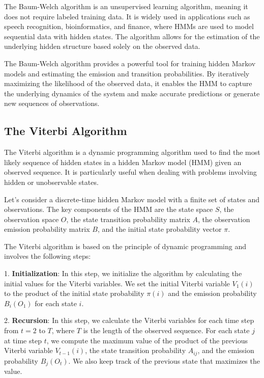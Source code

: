 \documentclass[a4paper,11pt]{article}
\begin{document}
The Baum-Welch algorithm is an unsupervised learning algorithm, meaning it does not require labeled training data. It is widely used in applications such as speech recognition, bioinformatics, and finance, where HMMs are used to model sequential data with hidden states. The algorithm allows for the estimation of the underlying hidden structure based solely on the observed data.

The Baum-Welch algorithm provides a powerful tool for training hidden Markov models and estimating the emission and transition probabilities. By iteratively maximizing the likelihood of the observed data, it enables the HMM to capture the underlying dynamics of the system and make accurate predictions or generate new sequences of observations.

\subsection{The Viterbi Algorithm}
\label{sec:viterbi}

The Viterbi algorithm is a dynamic programming algorithm used to find the most likely sequence of hidden states in a hidden Markov model (HMM) given an observed sequence. It is particularly useful when dealing with problems involving hidden or unobservable states.

Let's consider a discrete-time hidden Markov model with a finite set of states and observations. The key components of the HMM are the state space $S$, the observation space $O$, the state transition probability matrix $A$, the observation emission probability matrix $B$, and the initial state probability vector $\pi$.

The Viterbi algorithm is based on the principle of dynamic programming and involves the following steps:

1. \textbf{Initialization}: In this step, we initialize the algorithm by calculating the initial values for the Viterbi variables. We set the initial Viterbi variable $V_{1}(i)$ to the product of the initial state probability $\pi(i)$ and the emission probability $B_{i}(O_1)$ for each state $i$.

2. \textbf{Recursion}: In this step, we calculate the Viterbi variables for each time step from $t = 2$ to $T$, where $T$ is the length of the observed sequence. For each state $j$ at time step $t$, we compute the maximum value of the product of the previous Viterbi variable $V_{t-1}(i)$, the state transition probability $A_{ij}$, and the emission probability $B_{j}(O_t)$. We also keep track of the previous state that maximizes the value.
\end{document}
